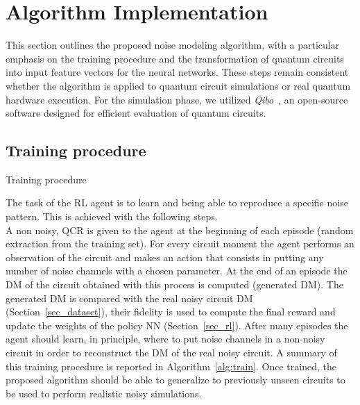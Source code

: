 \documentclass[sn-basic]{sn-jnl} %
\begin{document}
\section{Algorithm Implementation}\label{sec_methodology}
This section outlines the proposed noise modeling algorithm, 
with a particular emphasis on the training procedure 
and the transformation of quantum circuits into input feature vectors for the neural networks. 
These steps remain consistent whether the algorithm is applied to quantum circuit simulations or real quantum hardware execution. 
For the simulation phase, we utilized \textit{Qibo}~\cite{Efthymiou_2021}, 
an open-source software designed for efficient evaluation of quantum circuits.

\subsection{Training procedure}\label{sec_training}

\begin{algorithm*}
\caption{Training procedure}\label{alg:train}
\begin{algorithmic}
    \EndFor
\EndFor
\end{algorithmic}
\end{algorithm*}

The task of the RL agent is to learn and being able to reproduce a specific noise pattern. This is achieved with the following steps.\\
A non noisy, QCR is given to the agent at the beginning of each episode (random extraction from the training set). For every circuit moment the agent performs an observation of the circuit and makes an action that consists in putting any number of noise channels with a chosen parameter. At the end of an episode the DM of the circuit obtained with this process is computed (generated DM). The generated DM is compared with the real noisy circuit DM (Section~\ref{sec_dataset}), their fidelity is used to compute the final reward and update the weights of the policy NN (Section~\ref{sec_rl}).
After many episodes the agent should learn, in principle, where to put noise channels in a non-noisy circuit in order to reconstruct the DM of the real noisy circuit. 
A summary of this training procedure is reported in Algorithm~\ref{alg:train}. Once trained, the proposed algorithm should be able to generalize to previously unseen circuits to be used to perform realistic noisy simulations.\\
\end{document}
